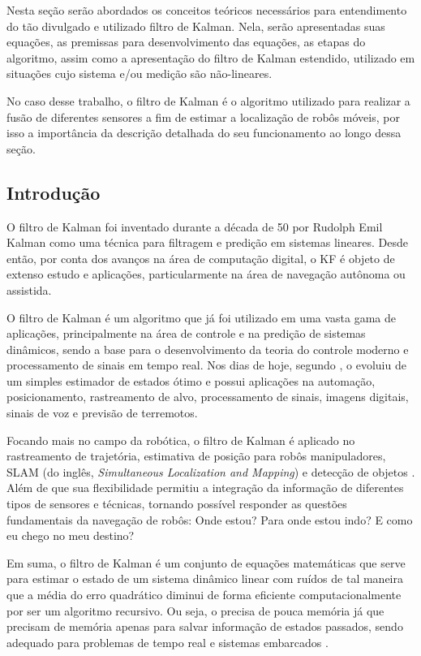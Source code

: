 \documentclass[acronym, symbols, table]{fei}
\begin{document}
		Nesta seção serão abordados os conceitos teóricos necessários para entendimento do tão divulgado e utilizado filtro de Kalman. Nela, serão apresentadas suas equações, as premissas para desenvolvimento das equações, as etapas do algoritmo, assim como a apresentação do filtro de Kalman estendido, utilizado em situações cujo sistema e/ou medição são não-lineares. 
		
		No caso desse trabalho, o filtro de Kalman é o algoritmo utilizado para realizar a fusão de diferentes sensores a fim de estimar a localização de robôs móveis, por isso a importância da descrição detalhada do seu funcionamento ao longo dessa seção.
		
		\subsection{Introdução}
		
			O filtro de Kalman foi inventado durante a década de 50 por Rudolph Emil Kalman como uma técnica para filtragem e predição em sistemas lineares. Desde então, por conta dos avanços na área de computação digital, o KF é objeto de extenso estudo e aplicações, particularmente na área de navegação autônoma ou assistida.
			
			O filtro de Kalman é um algoritmo que já foi utilizado em uma vasta gama de aplicações, principalmente na área de controle e na predição de sistemas dinâmicos, sendo a base para o desenvolvimento da teoria do controle moderno e processamento de sinais em tempo real. Nos dias de hoje, segundo \textcite{khodarahmi2023review}, o  evoluiu de um simples estimador de estados ótimo e possui aplicações na automação, posicionamento, rastreamento de alvo, processamento de sinais, imagens digitais, sinais de voz e previsão de terremotos.
			
			Focando mais no campo da robótica, o filtro de Kalman é aplicado no rastreamento de trajetória, estimativa de posição para robôs manipuladores, SLAM (do inglês, \textit{Simultaneous Localization and Mapping}) e detecção de objetos \cite{urrea2021kalman}. Além de que sua flexibilidade permitiu a integração da informação de diferentes tipos de sensores e técnicas, tornando possível responder as questões fundamentais da navegação de robôs: Onde estou? Para onde estou indo? E como eu chego no meu destino?
			
			Em suma, o filtro de Kalman é um conjunto de equações matemáticas que serve para estimar o estado de um sistema dinâmico linear com ruídos de tal maneira que a média do erro quadrático diminui de forma eficiente computacionalmente por ser um algoritmo recursivo. Ou seja, o  precisa de pouca memória já que precisam de memória apenas para salvar informação de estados passados, sendo adequado para problemas de tempo real e sistemas embarcados \cite{khodarahmi2023review}.
			
\end{document}
